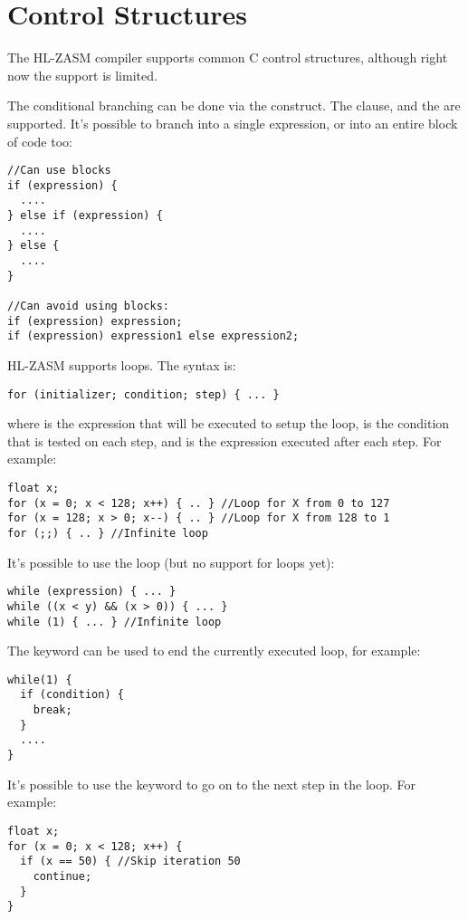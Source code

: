\section{Control Structures}
The HL-ZASM compiler supports common C control structures, although right now the support is limited.

The conditional branching can be done via the  construct. The  clause, and the  are supported. It's possible to branch into a single expression, or into an entire block of code too:
\begin{verbatim}
//Can use blocks
if (expression) {
  ....
} else if (expression) {
  ....
} else {
  ....
}

//Can avoid using blocks:
if (expression) expression;
if (expression) expression1 else expression2;
\end{verbatim}

HL-ZASM supports  loops. The syntax is:
\begin{verbatim}
for (initializer; condition; step) { ... }
\end{verbatim}
where  is the expression that will be executed to setup the loop,  is the condition that is tested on each step, and  is the expression executed after each step. For example:
\begin{verbatim}
float x;
for (x = 0; x < 128; x++) { .. } //Loop for X from 0 to 127
for (x = 128; x > 0; x--) { .. } //Loop for X from 128 to 1
for (;;) { .. } //Infinite loop
\end{verbatim}

It's possible to use the  loop (but no support for  loops yet):
\begin{verbatim}
while (expression) { ... }
while ((x < y) && (x > 0)) { ... }
while (1) { ... } //Infinite loop
\end{verbatim}

The  keyword can be used to end the currently executed loop, for example:
\begin{verbatim}
while(1) {
  if (condition) {
    break;
  }
  ....
}
\end{verbatim}

It's possible to use the  keyword to go on to the next step in the loop. For example:
\begin{verbatim}
float x;
for (x = 0; x < 128; x++) {
  if (x == 50) { //Skip iteration 50
    continue;
  }
}
\end{verbatim}

